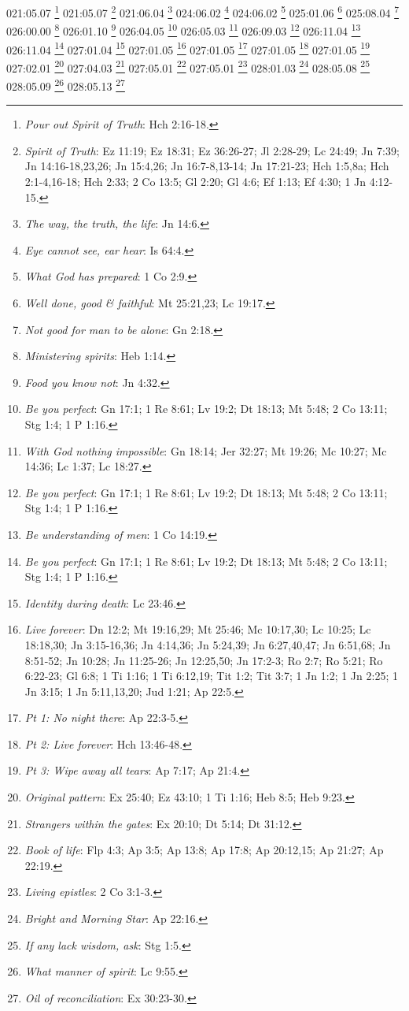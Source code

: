 {021:05.07 \footnote{\textit{Pour out Spirit of Truth}: Hch 2:16-18.}
021:05.07 \footnote{\textit{Spirit of Truth}: Ez 11:19; Ez 18:31; Ez 36:26-27; Jl 2:28-29; Lc 24:49; Jn 7:39; Jn 14:16-18,23,26; Jn 15:4,26; Jn 16:7-8,13-14; Jn 17:21-23; Hch 1:5,8a; Hch 2:1-4,16-18; Hch 2:33; 2 Co 13:5; Gl 2:20; Gl 4:6; Ef 1:13; Ef 4:30; 1 Jn 4:12-15.}
021:06.04 \footnote{\textit{The way, the truth, the life}: Jn 14:6.}
024:06.02 \footnote{\textit{Eye cannot see, ear hear}: Is 64:4.}
024:06.02 \footnote{\textit{What God has prepared}: 1 Co 2:9.}
025:01.06 \footnote{\textit{Well done, good & faithful}: Mt 25:21,23; Lc 19:17.}
025:08.04 \footnote{\textit{Not good for man to be alone}: Gn 2:18.}
026:00.00 \footnote{\textit{Ministering spirits}: Heb 1:14.}
026:01.10 \footnote{\textit{Food you know not}: Jn 4:32.}
026:04.05 \footnote{\textit{Be you perfect}: Gn 17:1; 1 Re 8:61; Lv 19:2; Dt 18:13; Mt 5:48; 2 Co 13:11; Stg 1:4; 1 P 1:16.}
026:05.03 \footnote{\textit{With God nothing impossible}: Gn 18:14; Jer 32:27; Mt 19:26; Mc 10:27; Mc 14:36; Lc 1:37; Lc 18:27.}
026:09.03 \footnote{\textit{Be you perfect}: Gn 17:1; 1 Re 8:61; Lv 19:2; Dt 18:13; Mt 5:48; 2 Co 13:11; Stg 1:4; 1 P 1:16.}
026:11.04 \footnote{\textit{Be understanding of men}: 1 Co 14:19.}
026:11.04 \footnote{\textit{Be you perfect}: Gn 17:1; 1 Re 8:61; Lv 19:2; Dt 18:13; Mt 5:48; 2 Co 13:11; Stg 1:4; 1 P 1:16.}
027:01.04 \footnote{\textit{Identity during death}: Lc 23:46.}
027:01.05 \footnote{\textit{Live forever}: Dn 12:2; Mt 19:16,29; Mt 25:46; Mc 10:17,30; Lc 10:25; Lc 18:18,30; Jn 3:15-16,36; Jn 4:14,36; Jn 5:24,39; Jn 6:27,40,47; Jn 6:51,68; Jn 8:51-52; Jn 10:28; Jn 11:25-26; Jn 12:25,50; Jn 17:2-3; Ro 2:7; Ro 5:21; Ro 6:22-23; Gl 6:8; 1 Ti 1:16; 1 Ti 6:12,19; Tit 1:2; Tit 3:7; 1 Jn 1:2; 1 Jn 2:25; 1 Jn 3:15; 1 Jn 5:11,13,20; Jud 1:21; Ap 22:5.}
027:01.05 \footnote{\textit{Pt 1: No night there}: Ap 22:3-5.}
027:01.05 \footnote{\textit{Pt 2: Live forever}: Hch 13:46-48.}
027:01.05 \footnote{\textit{Pt 3: Wipe away all tears}: Ap 7:17; Ap 21:4.}
027:02.01 \footnote{\textit{Original pattern}: Ex 25:40; Ez 43:10; 1 Ti 1:16; Heb 8:5; Heb 9:23.}
027:04.03 \footnote{\textit{Strangers within the gates}: Ex 20:10; Dt 5:14; Dt 31:12.}
027:05.01 \footnote{\textit{Book of life}: Flp 4:3; Ap 3:5; Ap 13:8; Ap 17:8; Ap 20:12,15; Ap 21:27; Ap 22:19.}
027:05.01 \footnote{\textit{Living epistles}: 2 Co 3:1-3.}
028:01.03 \footnote{\textit{Bright and Morning Star}: Ap 22:16.}
028:05.08 \footnote{\textit{If any lack wisdom, ask}: Stg 1:5.}
028:05.09 \footnote{\textit{What manner of spirit}: Lc 9:55.}
028:05.13 \footnote{\textit{Oil of reconciliation}: Ex 30:23-30.}
}
